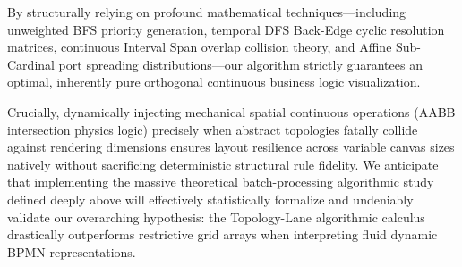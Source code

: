 \documentclass[fleqn,10pt]{wlscirep}
\begin{document}
By structurally relying on profound mathematical techniques—including unweighted BFS priority generation, temporal DFS Back-Edge cyclic resolution matrices, continuous Interval Span overlap collision theory, and Affine Sub-Cardinal port spreading distributions—our algorithm strictly guarantees an optimal, inherently pure orthogonal continuous business logic visualization. 

Crucially, dynamically injecting mechanical spatial continuous operations (AABB intersection physics logic) precisely when abstract topologies fatally collide against rendering dimensions ensures layout resilience across variable canvas sizes natively without sacrificing deterministic structural rule fidelity. We anticipate that implementing the massive theoretical batch-processing algorithmic study defined deeply above will effectively statistically formalize and undeniably validate our overarching hypothesis: the Topology-Lane algorithmic calculus drastically outperforms restrictive grid arrays when interpreting fluid dynamic BPMN representations.


\end{document}
